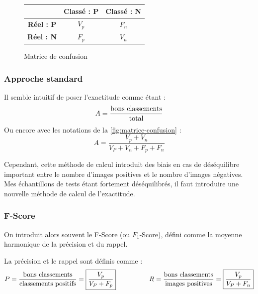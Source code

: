 \documentclass[12pt,a4paper]{article}
\begin{document}
\begin{figure}
    \renewcommand{\arraystretch}{1.5}
    \begin{tabular}{|c|c|c|}
        \cline{2-3}
        \multicolumn{1}{c|}{} & \textbf{Classé : P} & \textbf{Classé : N} \\
        \hline
        \textbf{Réel : P} & $V_p$ & $F_n$ \\
        \hline
        \textbf{Réel : N} & $F_p$ & $V_n$ \\
        \hline
    \end{tabular}
    \caption{Matrice de confusion}
    \label{fig:matrice-confusion}
\end{figure}


\subsubsection{Approche standard}
Il semble intuitif de poser l'exactitude comme étant :
\[
    A = \frac{\textnormal{bons classements}}{\textnormal{total}}
\]
Ou encore avec les notations de la \autoref{fig:matrice-confusion} :
\begin{equation}
    \boxed{A = \frac{V_p + V_n}{V_P + V_n + F_p + F_n}}
\end{equation}

Cependant, cette méthode de calcul introduit des biais en cas de déséquilibre important entre le nombre d'images positives et le nombre d'images négatives. Mes échantillons de tests étant fortement déséquilibrés, il faut introduire une nouvelle méthode de calcul de l'exactitude.

\subsubsection{F-Score}
On introduit alors souvent le F-Score (ou $F_1$-Score), défini comme la moyenne harmonique de la précision et du rappel. \cite{powers}

La précision et le rappel sont définis comme :
\begin{equation}
    P = \frac{\textnormal{bons classements}}{\textnormal{classements positifs}} = \boxed{\frac{V_p}{V_P + F_p}}
    \hspace{5em}
    R = \frac{\textnormal{bons classements}}{\textnormal{images positives}} = \boxed{\frac{V_p}{V_P + F_n}}
\end{equation}
\end{document}
